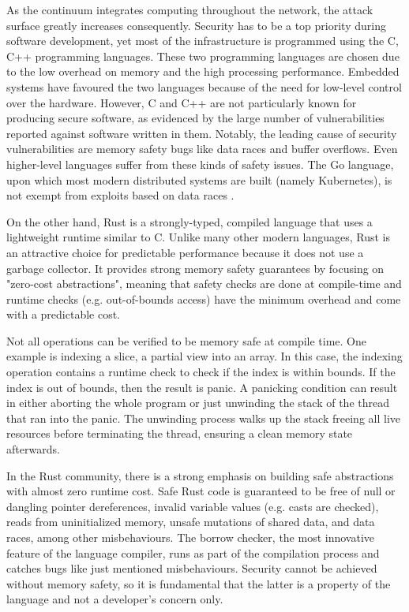 As the continuum integrates computing throughout the network, the attack surface greatly increases consequently. Security has to be a top priority during software development, yet most of the infrastructure is programmed using the C, C++ programming languages. These two programming languages are chosen due to the low overhead on memory and the high processing performance. Embedded systems have favoured the two languages because of the need for low-level control over the hardware.  However, C and C++ are not particularly known for producing secure software, as evidenced by the large number of vulnerabilities reported against software written in them. Notably, the leading cause of security vulnerabilities are memory safety bugs like data races and buffer overflows. Even higher-level languages suffer from these kinds of safety issues. The Go language, upon which most modern distributed systems are built (namely Kubernetes), is not exempt from exploits based on data races \cite{go-data-races}.

On the other hand, Rust is a strongly-typed, compiled language that uses a lightweight runtime similar to C. Unlike many other modern languages, Rust is an attractive choice for predictable performance because it does not use a garbage collector. It provides strong memory safety guarantees by focusing on "zero-cost abstractions", meaning that safety checks are done at compile-time and runtime checks (e.g. out-of-bounds access) have the minimum overhead and come with a predictable cost.

Not all operations can be verified to be memory safe at compile time. One example is indexing a slice, a partial view into an array. In this case, the indexing operation contains a runtime check to check if the index is within bounds. If the index is out of bounds, then the result is panic. A panicking condition can result in either aborting the whole program or just unwinding the stack of the thread that ran into the panic. The unwinding process walks up the stack freeing all live resources before terminating the thread, ensuring a clean memory state afterwards.

In the Rust community, there is a strong emphasis on building safe abstractions with almost zero runtime cost. Safe Rust code is guaranteed to be free of null or dangling pointer dereferences, invalid variable values (e.g. casts are checked), reads from uninitialized memory, unsafe mutations of shared data, and data races, among other misbehaviours.  The borrow checker, the most innovative feature of the language compiler, runs as part of the compilation process and catches bugs like just mentioned misbehaviours. Security cannot be achieved without memory safety, so it is fundamental that the latter is a property of the language and not a developer's concern only.

